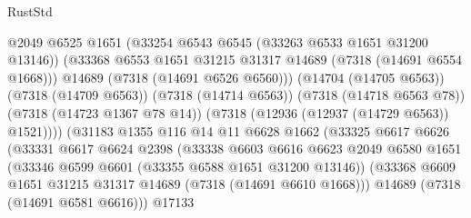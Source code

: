 \begin{lexlean}{RustStd}
\begin{coremodule}
                                      @2049
                                      @6525
                                      @1651
                                      (@33254 @6543 @6545 (@33263 @6533 @1651 @31200 @13146))
                                      (@33368
                                        @6553
                                        @1651
                                        @31215
                                        @31317
                                        @14689
                                        (@7318 (@14691 @6554 @1668)))
                                      @14689
                                      (@7318 (@14691 @6526 @6560)))
                                    (@14704 (@14705 @6563))
                                    (@7318 (@14709 @6563))
                                    (@7318 (@14714 @6563))
                                    (@7318 (@14718 @6563 @78))
                                    (@7318 (@14723 @1367 @78 @14))
                                    (@7318 (@12936 (@12937 (@14729 @6563)) @1521))))
                                (@31183
                                  @1355
                                  @116
                                  @14
                                  @11
                                  @6628
                                  @1662
                                  (@33325
                                    @6617
                                    @6626
                                    (@33331
                                      @6617
                                      @6624
                                      @2398
                                      (@33338
                                        @6603
                                        @6616
                                        @6623
                                        @2049
                                        @6580
                                        @1651
                                        (@33346 @6599 @6601 (@33355 @6588 @1651 @31200 @13146))
                                        (@33368
                                          @6609
                                          @1651
                                          @31215
                                          @31317
                                          @14689
                                          (@7318 (@14691 @6610 @1668)))
                                        @14689
                                        (@7318 (@14691 @6581 @6616)))
                                      @17133

\end{coremodule}
\end{lexlean}
